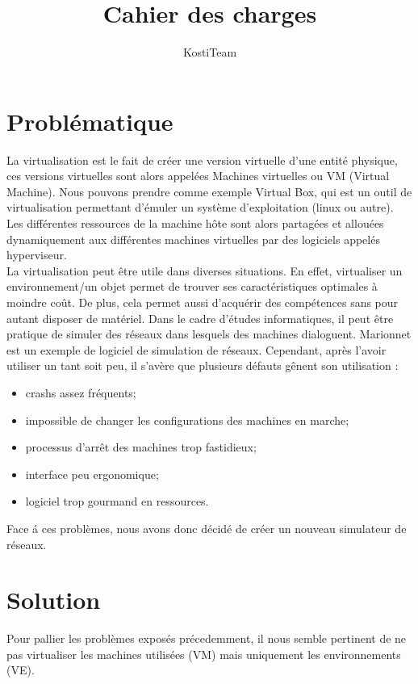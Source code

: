 \documentclass[a4paper]{article}
\author{KostiTeam}
\title{Cahier des charges}
\begin{document}
\maketitle
\newpage
\tableofcontents
\newpage

\section{Probl\'ematique}
La virtualisation est le fait de cr\'eer une version virtuelle d'une entit\'e physique, ces versions virtuelles
sont alors appel\'ees Machines virtuelles ou VM (Virtual Machine). Nous pouvons prendre comme exemple Virtual
Box, qui est un outil de virtualisation permettant d'\'emuler un syst\`eme d'exploitation (linux ou autre).
Les diff\'erentes ressources de la machine h\^ote sont alors partag\'ees et allou\'ees dynamiquement aux
diff\'erentes machines virtuelles par des logiciels appel\'es hyperviseur.\\

La virtualisation peut \^etre utile dans diverses situations. En effet, virtualiser un environnement/un objet 
permet de trouver ses caract\'eristiques optimales \`a moindre co\^ut. De plus, cela permet aussi d'acqu\'erir
des comp\'etences sans pour autant disposer de mat\'eriel. Dans le cadre d'\'etudes informatiques, il peut
\^etre pratique de simuler des r\'eseaux dans lesquels des machines dialoguent. Marionnet est un exemple de
logiciel de simulation de r\'eseaux. Cependant, apr\`es l'avoir utiliser un tant soit peu, il s'av\`ere que
plusieurs d\'efauts g\^enent son utilisation : 
\begin{itemize}
  \item crashs assez fr\'equents;
  \item impossible de changer les configurations des machines en marche;
  \item processus d'arr\^et des machines trop fastidieux;
  \item interface peu ergonomique;
  \item logiciel trop gourmand en ressources.
\end{itemize}


Face \'a ces probl\`emes, nous avons donc d\'ecid\'e de cr\'eer un nouveau simulateur de r\'eseaux.

\section{Solution}
Pour pallier les probl\`emes expos\'es pr\'ecedemment, il nous semble pertinent de ne pas virtualiser les
machines utilis\'ees  (VM) mais uniquement les environnements (VE).\\
\end{document}
